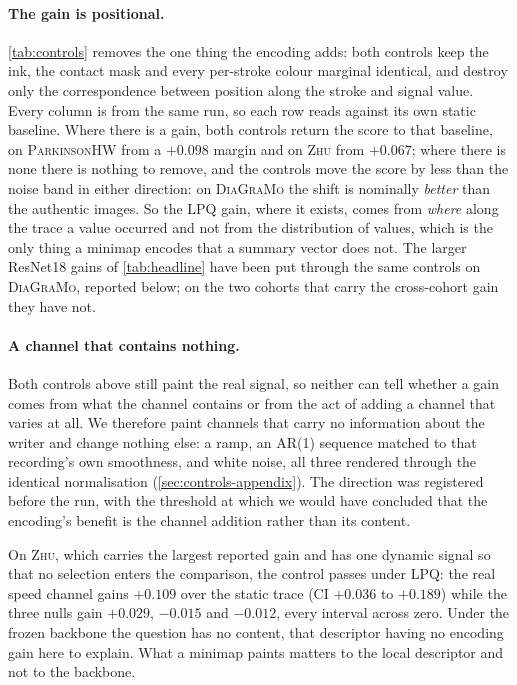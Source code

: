 \documentclass{article}
\begin{document}


\paragraph{The gain is positional.} \cref{tab:controls} removes the one thing the encoding adds:
both controls keep the ink, the contact mask and every per-stroke colour marginal identical, and
destroy only the correspondence between position along the stroke and signal value. Every column is
from the same run, so each row reads against its own static baseline. Where there is a gain, both
controls return the score to that baseline, on \textsc{ParkinsonHW} from a $+0.098$ margin and on
\textsc{Zhu} from $+0.067$; where there is none there is nothing to remove, and the controls move
the score by less than the noise band in either direction: on \textsc{DiaGraMo} the shift is
nominally \emph{better} than the authentic images. So the LPQ gain,
where it exists, comes from \emph{where} along the trace a value occurred and not from the
distribution of values, which is the only thing a minimap encodes that a summary vector does not.
The larger ResNet18 gains of \cref{tab:headline} have been put through the same controls on
\textsc{DiaGraMo}, reported below; on the two cohorts that carry the cross-cohort gain they have
not.

\paragraph{A channel that contains nothing.} Both controls above still paint the real signal, so
neither can tell whether a gain comes from what the channel contains or from the act of adding a
channel that varies at all. We therefore
paint channels that carry no information about the writer and change nothing else: a ramp, an AR(1)
sequence matched to that recording's own smoothness, and white noise, all three rendered through the
identical normalisation (\cref{sec:controls-appendix}). The direction was registered before the run,
with the threshold at which we would have concluded that the encoding's benefit is the channel
addition rather than its content.

On \textsc{Zhu}, which carries the largest reported gain and has one dynamic signal so that no
selection enters the comparison, the control passes under LPQ: the real speed channel gains $+0.109$
over the static trace (CI $+0.036$ to $+0.189$) while the three nulls gain $+0.029$, $-0.015$ and
$-0.012$, every interval across zero. Under the frozen backbone the question has no content, that
descriptor having no encoding gain here to explain. What a minimap paints matters to the local
descriptor and not to the backbone.
\end{document}
